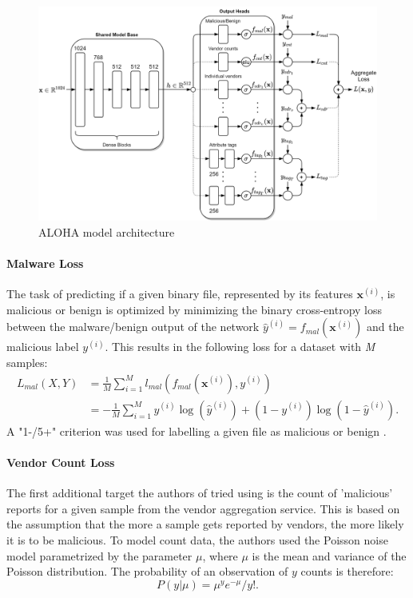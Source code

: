 \documentclass[pdfa%
,cucitura%
]{toptesi}
\begin{document}
\begin{figure}[h]
	\centering
	\includegraphics[width=\textwidth]{./images/ALOHA.png}
	\caption[ALOHA model architecture]{ALOHA model architecture}
	\label{fig:ALOHA_model}
\end{figure}

\paragraph{Malware Loss}\label{par:MalwareLoss}
The task of predicting if a given binary file, represented by its features $\textbf{x}^{(i)}$, is malicious or benign is optimized by minimizing the binary cross-entropy loss between the malware/benign output of the network $\hat{y}^{(i)} = f_{mal}(\textbf{x}^{(i)})$ and the malicious label $y^{(i)}$. This results in the following loss for a dataset with \textit{M} samples:
\begin{equation} \label{eq:alohaMalwareLoss}
	\begin{split}
		L_{mal}(X,Y) & = \frac{1}{M} \sum_{i=1}^{M} l_{mal} (f_{mal}(\textbf{x}^{(i)}), y^{(i)}) \\ & = -\frac{1}{M} \sum_{i=1}^{M} y^{(i)} \log(\hat{y}^{(i)}) + (1-y^{(i)}) \log(1-\hat{y}^{(i)}).
	\end{split}
\end{equation}
A "1-/5+" criterion was used for labelling a given file as malicious or benign \cite{ruddALOHA}.

\paragraph{Vendor Count Loss}\label{par:VendorCountLoss}
The first additional target the authors of \cite{ruddALOHA} tried using is the count of 'malicious' reports for a given sample from the vendor aggregation service. This is based on the assumption that the more a sample gets reported by vendors, the more likely it is to be malicious. To model count data, the authors used the Poisson noise model parametrized by the parameter $\mu$, where $\mu$ is the mean and variance of the Poisson distribution. The probability of an observation of $y$ counts is therefore:
\begin{equation} \label{eq:alohaPoisson}
	P(y|\mu) = \mu^y e^{-\mu}/y!.
\end{equation}
\end{document}
